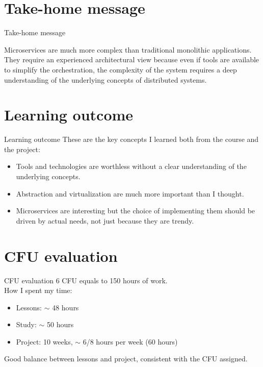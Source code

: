 \documentclass{beamer}
\begin{document}
\section{Take-home message}
\begin{frame}{Take-home message}
	\begin{block}{}
		Microservices are much more complex than traditional monolithic applications. They require an experienced architectural view because even if tools are available to simplify the orchestration, the complexity of the system requires a deep understanding of the underlying concepts of distributed systems.
	\end{block}
\end{frame}
\section{Learning outcome}
\begin{frame}{Learning outcome}
	These are the key concepts I learned both from the course and the project:
	\begin{itemize}
		\item Tools and technologies are worthless without a clear understanding of the underlying concepts.
		\item Abstraction and virtualization are much more important than I thought. %
		\item Microservices are interesting but the choice of implementing them should be driven by actual needs, not just because they are trendy.
	\end{itemize}
\end{frame}
\section{CFU evaluation}
\begin{frame}{CFU evaluation}
	6 CFU equals to 150 hours of work.
	\\
	How I spent my time:
	\begin{itemize}
		\item Lessons: $\sim$ 48 hours
		\item Study: $\sim$ 50 hours
		\item Project: 10 weeks, $\sim$ 6/8 hours per week (60 hours)
	\end{itemize}
	\begin{block}{}
		Good balance between lessons and project, consistent with the CFU assigned.
	\end{block}
\end{frame}
\end{document}
